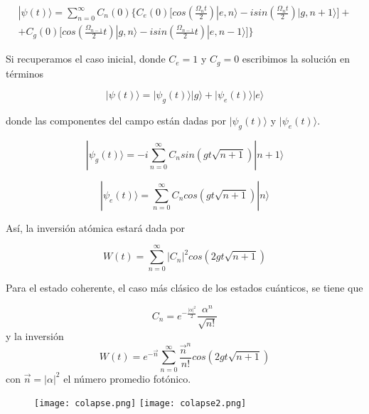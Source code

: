 \documentclass[spanish]{article}
\begin{document}
\begin{equation}
\begin{split}
|\psi(t) \rangle = \sum_{n=0}^\infty C_n(0)\bigg\{C_e(0)\bigg[cos(\frac{\Omega_n t}{2})|e,n\rangle -i sin(\frac{\Omega_n t}{2})|g,n+1\rangle\bigg]+ \\
+C_g(0)\bigg[cos(\frac{\Omega_{n-1}}{2}t)|g,n\rangle - isin(\frac{\Omega_{n-1}}{2}t)|e,n-1\rangle \bigg]\bigg\}
\end{split}
\label{estado}
\end{equation}

Si recuperamos el caso inicial, donde $C_e = 1 $ y $C_g = 0$ escribimos la solución en términos 

$$ |\psi(t)\rangle = |\psi_g(t) \rangle |g\rangle + |\psi_e(t)\rangle |e\rangle $$

donde las componentes del campo están dadas por $|\psi_g(t) \rangle$ y $|\psi_e(t) \rangle$.

\begin{equation}
|\psi_g(t) \rangle = -i \sum_{n=0}^\infty C_n sin(gt\sqrt{n+1})|n+1\rangle
\end{equation}

\begin{equation}
|\psi_e(t) \rangle = \sum_{n=0}^\infty C_n cos(gt\sqrt{n+1})|n\rangle
\end{equation}

Así, la inversión atómica estará dada por 

\begin{equation}
W(t) = \sum_{n=0}^\infty |C_n|^2 cos (2gt\sqrt{n+1})
\end{equation}

Para el estado coherente, el caso más clásico de los estados cuánticos, se tiene que 

\begin{equation}
C_n = e^{-\frac{|\alpha|^2}{2}}\frac{\alpha^n}{\sqrt{n!}}
\end{equation}
y la inversión 
\begin{equation}
W(t) = e^{-\vec{n}} \sum_{n=0}^\infty \frac{\vec{n}^n}{n!}cos (2gt\sqrt{n+1})
\end{equation} con $ \vec{n} = |\alpha|^2 $ el número promedio fotónico. 

\begin{figure}[H]
\centering
\texttt{[image: colapse.png]}
\texttt{[image: colapse2.png]}
\caption{}
\label{}
\end{figure}
\end{document}
